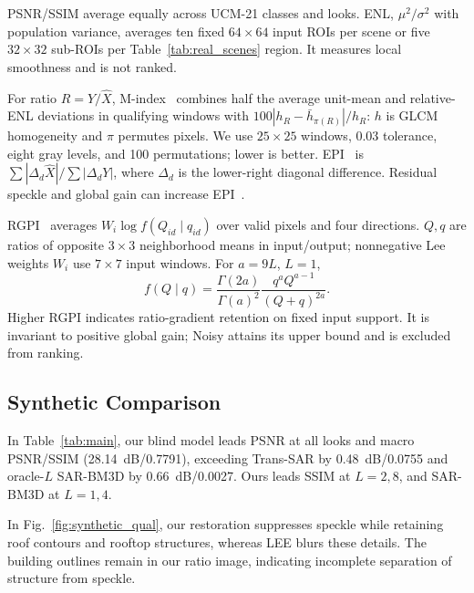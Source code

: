 \documentclass[journal]{IEEEtran}
\newcommand{\rev}[1]{{\color{RevisionBlue}#1}}
\newcommand{\condensed}[1]{{\color{CondensedGreen}#1}}
\newcommand{\rev}[1]{#1}
\newcommand{\condensed}[1]{#1}
\begin{document}
\rev{PSNR/SSIM average equally across UCM-21 classes and looks. ENL, \(\mu^2/\sigma^2\) with population variance, averages ten fixed \(64\times64\) input ROIs per scene or five \(32\times32\) sub-ROIs per Table~\ref{tab:real_scenes} region. It measures local smoothness and is not ranked.}

\rev{For ratio \(R=Y/\widehat X\), M-index~\cite{gomez2017} combines half the average unit-mean and relative-ENL deviations in qualifying windows with \(100|h_R-\bar h_{\pi(R)}|/h_R\): \(h\) is GLCM homogeneity and \(\pi\) permutes pixels. We use \(25\times25\) windows, 0.03 tolerance, eight gray levels, and 100 permutations; lower is better. EPI~\cite{ma2024epi} is \(\sum|\Delta_d\widehat X|/\sum|\Delta_dY|\), where \(\Delta_d\) is the lower-right diagonal difference. Residual speckle and global gain can increase EPI~\cite{vasquez2025ratio}.}

\rev{RGPI~\cite{ma2022rgpi} averages \(W_i\log f(Q_{id}\mid q_{id})\) over valid pixels and four directions. \(Q,q\) are ratios of opposite \(3\times3\) neighborhood means in input/output; nonnegative Lee weights \(W_i\) use \(7\times7\) input windows. For \(a=9L\), \(L=1\),
\begin{equation}
f(Q\mid q)=\frac{\Gamma(2a)}{\Gamma(a)^2}\frac{q^aQ^{a-1}}{(Q+q)^{2a}}.
\label{eq:rgpi}
\end{equation}
Higher RGPI indicates ratio-gradient retention on fixed input support. It is invariant to positive global gain; Noisy attains its upper bound and is excluded from ranking.}

\subsection{Synthetic Comparison}
\condensed{In Table~\ref{tab:main}, our blind model leads PSNR at all looks and macro PSNR/SSIM (28.14~dB/0.7791), exceeding Trans-SAR by 0.48~dB/0.0755 and oracle-\(L\) SAR-BM3D by 0.66~dB/0.0027. Ours leads SSIM at \(L=2,8\), and SAR-BM3D at \(L=1,4\).}

In Fig.~\ref{fig:synthetic_qual}, our restoration suppresses speckle while retaining roof contours and rooftop structures, whereas LEE blurs these details. The building outlines remain in our ratio image, indicating incomplete separation of structure from speckle.
\end{document}

